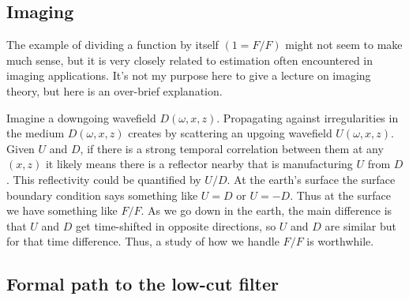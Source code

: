 \subsection{Imaging}
The example of dividing a function by itself $(1=F/F)$ might not
seem to make much sense, but it is very closely related to estimation
often encountered in imaging applications.
It's not my purpose here to give a lecture on imaging theory, but
here is an over-brief explanation.
\par
Imagine a downgoing wavefield $D(\omega,x,z)$. Propagating against irregularities in  the medium $D(\omega, x , z )$
creates by scattering  an upgoing wavefield $U(\omega,x,z)$.
Given $U$ and $D$, if there is a strong temporal correlation between them
at any $(x,z)$ it likely means there is a reflector nearby that is
manufacturing $U$ from $D$.
This reflectivity could be quantified by $U/D$.
At the earth's surface the surface boundary condition says something like
$U=D$ or $U=-D$.   Thus at the surface we have something like $F/F$.
As we go down in the earth, the main difference is that $U$ and $D$ get
time-shifted in opposite directions, so $U$ and $D$ are similar but
for that time difference.  Thus, a study of how we handle $F/F$ is worthwhile.

\subsection{Formal path to the low-cut filter}

